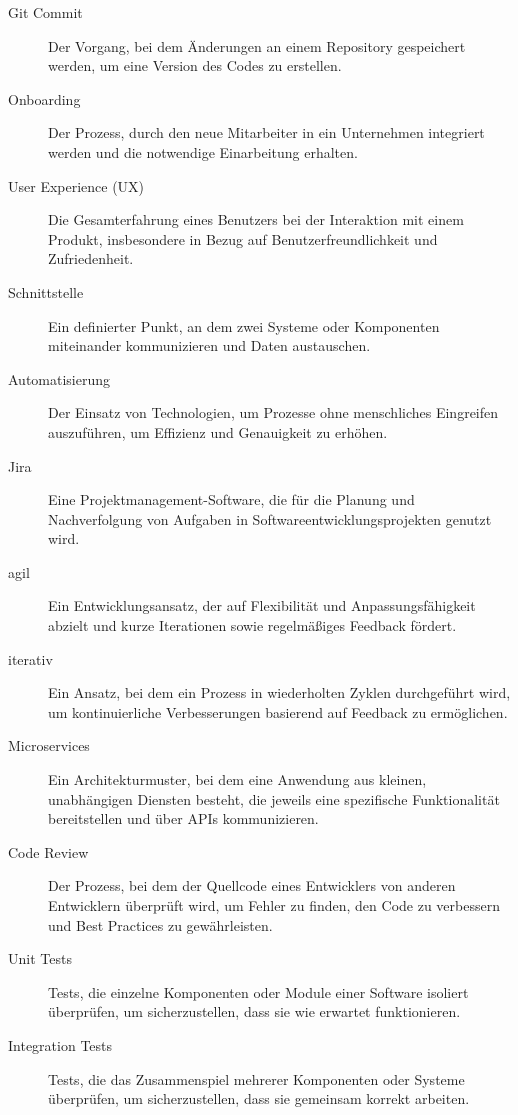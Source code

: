 \begin{description}
    \item[\hypertarget{GitCommit}{Git Commit}] Der Vorgang, bei dem Änderungen an einem Repository gespeichert werden, um eine Version des Codes zu erstellen.
    \item[\hypertarget{Onboarding}{Onboarding}] Der Prozess, durch den neue Mitarbeiter in ein Unternehmen integriert werden und die notwendige Einarbeitung erhalten.
    \item[\hypertarget{UserExperience}{User Experience (UX)}] Die Gesamterfahrung eines Benutzers bei der Interaktion mit einem Produkt, insbesondere in Bezug auf Benutzerfreundlichkeit und Zufriedenheit.
    \item[\hypertarget{Schnittstelle}{Schnittstelle}] Ein definierter Punkt, an dem zwei Systeme oder Komponenten miteinander kommunizieren und Daten austauschen.
    \item[\hypertarget{Automatisierung}{Automatisierung}] Der Einsatz von Technologien, um Prozesse ohne menschliches Eingreifen auszuführen, um Effizienz und Genauigkeit zu erhöhen.
    \item[\hypertarget{Jira}{Jira}] Eine Projektmanagement-Software, die für die Planung und Nachverfolgung von Aufgaben in Softwareentwicklungsprojekten genutzt wird.
    \item[\hypertarget{agil}{agil}] Ein Entwicklungsansatz, der auf Flexibilität und Anpassungsfähigkeit abzielt und kurze Iterationen sowie regelmäßiges Feedback fördert.
    \item[\hypertarget{iterativ}{iterativ}] Ein Ansatz, bei dem ein Prozess in wiederholten Zyklen durchgeführt wird, um kontinuierliche Verbesserungen basierend auf Feedback zu ermöglichen.
    \item[\hypertarget{Microservices}{Microservices}] Ein Architekturmuster, bei dem eine Anwendung aus kleinen, unabhängigen Diensten besteht, die jeweils eine spezifische Funktionalität bereitstellen und über APIs kommunizieren.
    \item[\hypertarget{CodeReview}{Code Review}] Der Prozess, bei dem der Quellcode eines Entwicklers von anderen Entwicklern überprüft wird, um Fehler zu finden, den Code zu verbessern und Best Practices zu gewährleisten.
    \item[\hypertarget{UnitTests}{Unit Tests}] Tests, die einzelne Komponenten oder Module einer Software isoliert überprüfen, um sicherzustellen, dass sie wie erwartet funktionieren.
    \item[\hypertarget{IntegrationTests}{Integration Tests}] Tests, die das Zusammenspiel mehrerer Komponenten oder Systeme überprüfen, um sicherzustellen, dass sie gemeinsam korrekt arbeiten.

\end{description}
